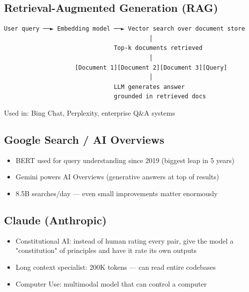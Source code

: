 \documentclass[11pt]{article}
\providecommand{\tightlist}{\setlength{\itemsep}{1pt}\setlength{\parskip}{0pt}}
\begin{document}
\subsection{Retrieval-Augmented Generation (RAG)}\label{retrieval-augmented-generation-rag}

\setcodelang{}

\begin{verbatim}
User query ──► Embedding model ──► Vector search over document store
                                         │
                               Top-k documents retrieved
                                         │
                    [Document 1][Document 2][Document 3][Query]
                                         │
                               LLM generates answer
                               grounded in retrieved docs
\end{verbatim}

Used in: Bing Chat, Perplexity, enterprise Q\&A systems

\subsection{Google Search / AI Overviews}\label{google-search--ai-overviews}

\begin{itemize}
\tightlist
\item
  BERT used for query understanding since 2019 (biggest leap in 5 years)
\item
  Gemini powers AI Overviews (generative answers at top of results)
\item
  8.5B searches/day --- even small improvements matter enormously
\end{itemize}

\subsection{Claude (Anthropic)}\label{claude-anthropic}

\begin{itemize}
\tightlist
\item
  Constitutional AI: instead of human rating every pair, give the model a "constitution" of principles and have it rate its own outputs
\item
  Long context specialist: 200K tokens --- can read entire codebases
\item
  Computer Use: multimodal model that can control a computer
\end{itemize}
\end{document}
